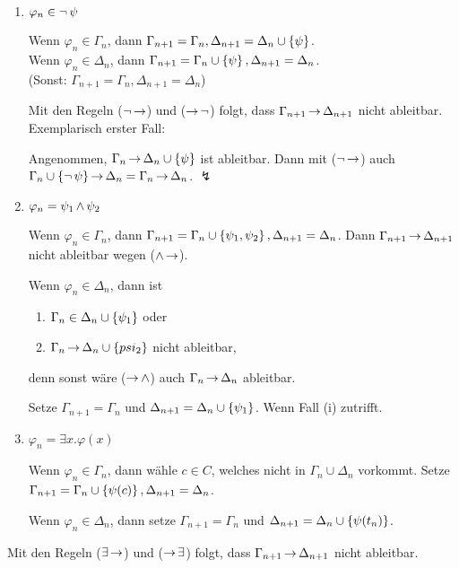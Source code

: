\begin{enumerate}
  \item $\varphi_n \in \operatorname{\neg}\psi$
  
  Wenn $\varphi_n \in \Gamma_n$, dann $\Gamma_{n+1}=\Gamma_n, \Delta_{n+1}=\Delta_n\cup\left\{\psi\right\}$.\\
  Wenn $\varphi_n \in \Delta_n$, dann $\Gamma_{n+1}=\Gamma_n\cup\left\{\psi\right\}, \Delta_{n+1}=\Delta_n$.\\
  (Sonst: $\Gamma_{n+1}=\Gamma_n, \Delta_{n+1}=\Delta_n$)
  
  Mit den Regeln ($\operatorname{\neg}\operatorname{\rightarrow}$) und ($\operatorname{\rightarrow}\operatorname{\neg}$) folgt, dass $\Gamma_{n+1}\operatorname{\rightarrow}\Delta_{n+1}$ nicht ableitbar.
  Exemplarisch erster Fall:
  
  Angenommen, $\Gamma_n\operatorname{\rightarrow}\Delta_n\cup\left\{\psi\right\}$ ist ableitbar. Dann mit ($\operatorname{\neg}\operatorname{\rightarrow}$)
  auch $\Gamma_n\cup\left\{\operatorname{\neg}\psi\right\}\operatorname{\rightarrow}\Delta_n=\Gamma_n\operatorname{\rightarrow}\Delta_n$. $\lightning$
  
  \item $\varphi_n = \psi_1 \operatorname{\wedge} \psi_2$
  
  Wenn $\varphi_n \in \Gamma_n$, dann $\Gamma_{n+1}=\Gamma_n\cup\left\{\psi_1,\psi_2\right\}, \Delta_{n+1}=\Delta_n$.
  Dann $\Gamma_{n+1}\operatorname{\rightarrow}\Delta_{n+1}$ nicht ableitbar wegen ($\operatorname{\wedge}\operatorname{\rightarrow}$).
  
  Wenn $\varphi_n\in\Delta_n$, dann ist

  \begin{enumerate}[label=(\roman*)]
    \item $\Gamma_n \in \Delta_n\cup\left\{\psi_1\right\}$ oder
    \item $\Gamma_n\operatorname{\rightarrow}\Delta_n\cup\left\{psi_2\right\}$ nicht ableitbar,
  \end{enumerate}

  denn sonst wäre ($\operatorname{\rightarrow}\operatorname{\wedge}$) auch $\Gamma_n\operatorname{\rightarrow}\Delta_n$ ableitbar.
  
  Setze $\Gamma_{n+1}=\Gamma_n$ und $\Delta_{n+1}=\Delta_n\cup\left\{\psi_1\right\}$.
  Wenn Fall (i) zutrifft.
  
  \item $\varphi_n = \exists x.\varphi(x)$
  
  Wenn $\varphi_n\in\Gamma_n$, dann wähle $c\in C$, welches nicht in
  $\Gamma_n\cup\Delta_n$ vorkommt. Setze $\Gamma_{n+1}=\Gamma_n\cup\left\{\psi(c)\right\},
  \Delta_{n+1}=\Delta_n$.
  
  Wenn $\varphi_n\in\Delta_n$, dann setze $\Gamma_{n+1}=\Gamma_n$ und
  $\Delta_{n+1}=\Delta_n\cup\left\{\psi(t_n)\right\}$.
\end{enumerate}

Mit den Regeln ($\exists\operatorname{\rightarrow}$) und ($\operatorname{\rightarrow}\exists$) folgt, dass
$\Gamma_{n+1}\operatorname{\rightarrow}\Delta_{n+1}$ nicht ableitbar.

